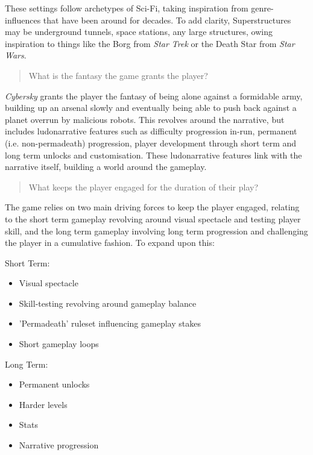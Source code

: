 \documentclass{scrartcl}
\begin{document}
These settings follow archetypes of Sci-Fi, taking inspiration from genre-influences that have been around for decades. To add clarity, Superstructures may be underground tunnels, space stations, any large structures, owing inspiration to things like the Borg from \emph{Star Trek} or the Death Star from \emph{Star Wars}.

\begin{quote}
  What is the fantasy the game grants the player?
\end{quote}

\emph{Cybersky} grants the player the fantasy of being alone against a formidable army, building up an arsenal slowly and eventually being able to push back against a planet overrun by malicious robots. This revolves around the narrative, but includes ludonarrative features such as difficulty progression in-run, permanent (i.e. non-permadeath) progression, player development through short term and long term unlocks and customisation. These ludonarrative features link with the narrative itself, building a world around the gameplay.

\begin{quote}
  What keeps the player engaged for the duration of their play?
\end{quote}

The game relies on two main driving forces to keep the player engaged, relating to the short term gameplay revolving around visual spectacle and testing player skill, and the long term gameplay involving long term progression and challenging the player in a cumulative fashion. To expand upon this:

Short Term:

\begin{itemize}
  \item Visual spectacle
  \item Skill-testing revolving around gameplay balance
  \item 'Permadeath' ruleset influencing gameplay stakes
  \item Short gameplay loops
\end{itemize}

Long Term:

\begin{itemize}
  \item Permanent unlocks
  \item Harder levels
  \item Stats
  \item Narrative progression
\end{itemize}
\end{document}
